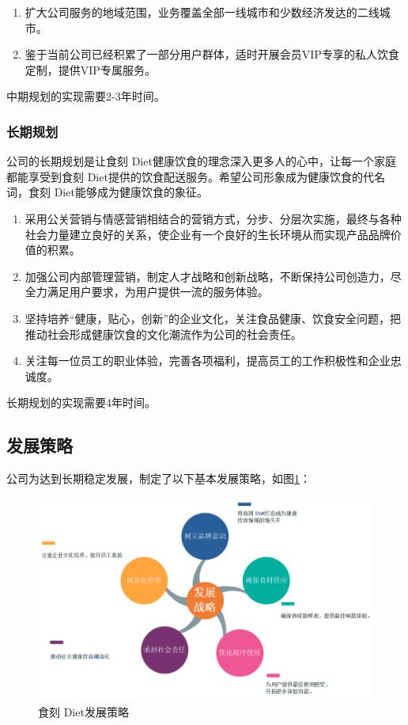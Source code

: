 \documentclass[UTF8,12pt]{ctexart}
\numberwithin{figure}{section}%
\begin{document}
\begin{spacing}{2}
\begin{enumerate}
	\item[(3)] 扩大公司服务的地域范围，业务覆盖全部一线城市和少数经济发达的二线城市。
	
	\item[(4)]鉴于当前公司已经积累了一部分用户群体，适时开展会员VIP专享的私人饮食定制，提供VIP专属服务。
	
\end{enumerate}

中期规划的实现需要2-3年时间。

\subsubsection{长期规划}
公司的长期规划是让食刻 Diet健康饮食的理念深入更多人的心中，让每一个家庭都能享受到食刻 Diet提供的饮食配送服务。希望公司形象成为健康饮食的代名词，食刻 Diet能够成为健康饮食的象征。

\begin{enumerate}
	\item[(1)]采用公关营销与情感营销相结合的营销方式，分步、分层次实施，最终与各种社会力量建立良好的关系，使企业有一个良好的生长环境从而实现产品品牌价值的积累。
	
	\item[(2)]加强公司内部管理营销，制定人才战略和创新战略，不断保持公司创造力，尽全力满足用户要求，为用户提供一流的服务体验。
	
	\item[(3)] 坚持培养“健康，贴心，创新”的企业文化，关注食品健康、饮食安全问题，把推动社会形成健康饮食的文化潮流作为公司的社会责任。
	
	\item[(4)]关注每一位员工的职业体验，完善各项福利，提高员工的工作积极性和企业忠诚度。
	
\end{enumerate}	

长期规划的实现需要4年时间。

\newpage

\subsection{发展策略}

公司为达到长期稳定发展，制定了以下基本发展策略，如图\ref{fazhan}：

\begin{figure}[!htb]
	\centering
	\includegraphics[width=12cm]{fig/9}
	\caption{食刻 Diet发展策略}\label{fazhan}
\end{figure}



\end{spacing}
\end{document}
